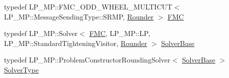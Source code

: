 \begin{DoxyCompactItemize}
\item 
typedef L\+P\+\_\+\+M\+P\+::\+F\+M\+C\+\_\+\+O\+D\+D\+\_\+\+W\+H\+E\+E\+L\+\_\+\+M\+U\+L\+T\+I\+C\+U\+T$<$ L\+P\+\_\+\+M\+P\+::\+Message\+Sending\+Type\+::\+S\+R\+M\+P, \hyperlink{classnifty_1_1graph_1_1optimization_1_1multicut_1_1MulticutMp_a9f5b323f0e6ed2481e20fb12309b3451}{Rounder} $>$ \hyperlink{classnifty_1_1graph_1_1optimization_1_1multicut_1_1MulticutMp_a7552c779f02ea5560312fd9fb10f248d}{F\+M\+C}
\item 
typedef L\+P\+\_\+\+M\+P\+::\+Solver$<$ \hyperlink{classnifty_1_1graph_1_1optimization_1_1multicut_1_1MulticutMp_a7552c779f02ea5560312fd9fb10f248d}{F\+M\+C}, L\+P\+\_\+\+M\+P\+::\+L\+P, L\+P\+\_\+\+M\+P\+::\+Standard\+Tightening\+Visitor, \hyperlink{classnifty_1_1graph_1_1optimization_1_1multicut_1_1MulticutMp_a9f5b323f0e6ed2481e20fb12309b3451}{Rounder} $>$ \hyperlink{classnifty_1_1graph_1_1optimization_1_1multicut_1_1MulticutMp_a8dbfef3a17fbb97d50db19cef1309e8a}{Solver\+Base}
\item 
typedef L\+P\+\_\+\+M\+P\+::\+Problem\+Constructor\+Rounding\+Solver$<$ \hyperlink{classnifty_1_1graph_1_1optimization_1_1multicut_1_1MulticutMp_a8dbfef3a17fbb97d50db19cef1309e8a}{Solver\+Base} $>$ \hyperlink{classnifty_1_1graph_1_1optimization_1_1multicut_1_1MulticutMp_a9566cf8542059862763c8c936a032cb0}{Solver\+Type}
\end{DoxyCompactItemize}
